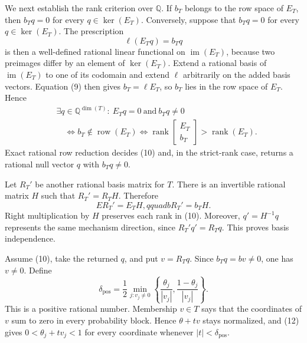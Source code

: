 We next establish the rank criterion over \(\mathbb Q\).  If \(b_T\) belongs to the row space of \(E_T\), then \(b_Tq=0\) for every \(q\in\ker(E_T)\).  Conversely, suppose that \(b_Tq=0\) for every \(q\in\ker(E_T)\).  The prescription
\[
 \ell(E_Tq)=b_Tq                                                \tag{9}
\]
is then a well-defined rational linear functional on \(\operatorname{im}(E_T)\), because two preimages differ by an element of \(\ker(E_T)\).  Extend a rational basis of \(\operatorname{im}(E_T)\) to one of its codomain and extend \(\ell\) arbitrarily on the added basis vectors.  Equation (9) then gives \(b_T=\ell E_T\), so \(b_T\) lies in the row space of \(E_T\).  Hence
\[
\begin{aligned}
 &\exists q\in\mathbb Q^{\dim(T)}:\ E_Tq=0\ \text{and}\ b_Tq\ne0\\
 &\quad\Longleftrightarrow b_T\notin\operatorname{row}(E_T)
 \Longleftrightarrow
 \operatorname{rank}\!\begin{bmatrix}E_T\\ b_T\end{bmatrix}
 >\operatorname{rank}(E_T).                                    \tag{10}
\end{aligned}
\]
Exact rational row reduction decides (10) and, in the strict-rank case, returns a rational null vector \(q\) with \(b_Tq\ne0\).

Let \(R_T'\) be another rational basis matrix for \(T\).  There is an invertible rational matrix \(H\) such that \(R_T'=R_TH\).  Therefore
\[
 ER_T'=E_TH,qquad bR_T'=b_TH.                                  \tag{11}
\]
Right multiplication by \(H\) preserves each rank in (10).  Moreover, \(q'=H^{-1}q\) represents the same mechanism direction, since \(R_T'q'=R_Tq\).  This proves basis independence.

Assume (10), take the returned \(q\), and put \(v=R_Tq\).  Since \(b_Tq=bv\ne0\), one has \(v\ne0\).  Define
\[
 \delta_{\mathrm{pos}}
 =\frac12\min_{j:v_j\ne0}
 \left\{\frac{\theta_j}{|v_j|},
              \frac{1-\theta_j}{|v_j|}\right\}.               \tag{12}
\]
This is a positive rational number.  Membership \(v\in T\) says that the coordinates of \(v\) sum to zero in every probability block.  Hence \(\theta+t v\) stays normalized, and (12) gives \(0<\theta_j+t v_j<1\) for every coordinate whenever \(|t|<\delta_{\mathrm{pos}}\).

